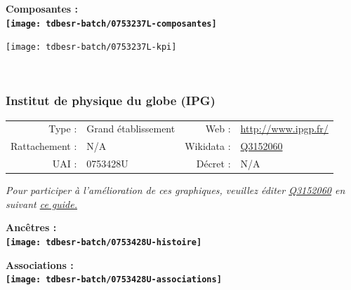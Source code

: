 \documentclass[12pt,french,]{article}
\begin{document}
\hrulefill

\begin{center} \bf Composantes : \\  
\texttt{[image: tdbesr-batch/0753237L-composantes]} \end{center}

\begin{center}\texttt{[image: tdbesr-batch/0753237L-kpi]} \end{center}\checkoddpage

\ifoddpage ~\newpage \fi   

\hypertarget{institut-de-physique-du-globe-ipg}{%
\subsubsection{Institut de physique du globe
(IPG)}\label{institut-de-physique-du-globe-ipg}}

\begin{tabular*}{\textwidth}{rp{5cm}rl}  
\hline  
Type : & Grand établissement & Web : &\href{http://www.ipgp.fr/}{http://www.ipgp.fr/} \\  
Rattachement : & N/A & Wikidata : & \href{https://www.wikidata.org/entity/Q3152060}{Q3152060} \\  
UAI : & 0753428U & Décret : & N/A \\  
\hline  
\end{tabular*}

\textit{\scriptsize Pour participer à l'amélioration de ces graphiques, veuillez éditer  \href{https://www.wikidata.org/entity/Q3152060}{Q3152060}  en suivant \href{https://github.com/cpesr/wikidataESR/blob/master/Rmd/wikidataESR.md}{ce guide.}}

\vspace{1cm}  
\begin{minipage}[b]{0.50\textwidth}\begin{center} \bf Ancêtres : \\  
\texttt{[image: tdbesr-batch/0753428U-histoire]} \end{center}\end{minipage}\begin{minipage}[b]{0.50\textwidth}\begin{center} \bf Associations : \\  
\texttt{[image: tdbesr-batch/0753428U-associations]} \end{center}\end{minipage}

\hrulefill
\end{document}
